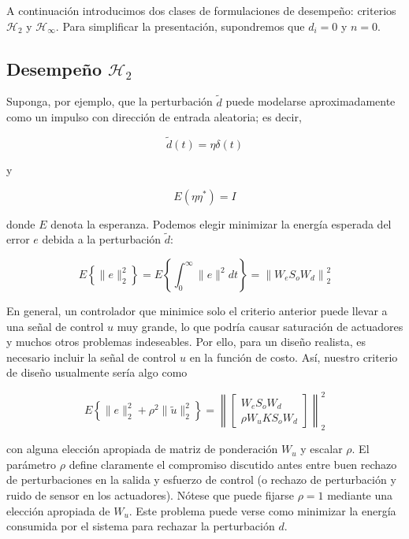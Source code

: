 A continuación introducimos dos clases de formulaciones de desempeño: criterios $\mathcal{H}_{2}$ y $\mathcal{H}_{\infty}$. Para simplificar la presentación, supondremos que $d_{i}=0$ y $n=0$.

\subsection*{Desempeño $\mathcal{H}_{2}$}
Suponga, por ejemplo, que la perturbación $\tilde{d}$ puede modelarse aproximadamente como un impulso con dirección de entrada aleatoria; es decir,

$$
\tilde{d}(t)=\eta \delta(t)
$$

y

$$
E\left(\eta \eta^{*}\right)=I
$$

donde $E$ denota la esperanza. Podemos elegir minimizar la energía esperada del error $e$ debida a la perturbación $\tilde{d}$:

$$
E\left\{\|e\|_{2}^{2}\right\}=E\left\{\int_{0}^{\infty}\|e\|^{2} d t\right\}=\left\|W_{e} S_{o} W_{d}\right\|_{2}^{2}
$$

En general, un controlador que minimice solo el criterio anterior puede llevar a una señal de control $u$ muy grande, lo que podría causar saturación de actuadores y muchos otros problemas indeseables. Por ello, para un diseño realista, es necesario incluir la señal de control $u$ en la función de costo. Así, nuestro criterio de diseño usualmente sería algo como

$$
E\left\{\|e\|_{2}^{2}+\rho^{2}\|\tilde{u}\|_{2}^{2}\right\}=\left\|\left[\begin{array}{c}
W_{e} S_{o} W_{d} \\
\rho W_{u} K S_{o} W_{d}
\end{array}\right]\right\|_{2}^{2}
$$

con alguna elección apropiada de matriz de ponderación $W_{u}$ y escalar $\rho$. El parámetro $\rho$ define claramente el compromiso discutido antes entre buen rechazo de perturbaciones en la salida y esfuerzo de control (o rechazo de perturbación y ruido de sensor en los actuadores). Nótese que puede fijarse $\rho=1$ mediante una elección apropiada de $W_{u}$. Este problema puede verse como minimizar la energía consumida por el sistema para rechazar la perturbación $d$.

